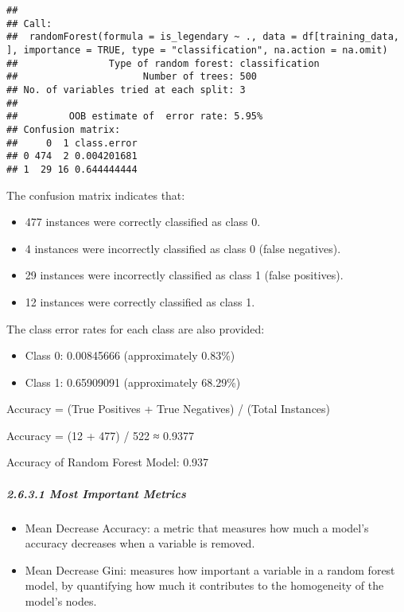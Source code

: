 \documentclass[
]{article}
\begin{document}
\begin{verbatim}
## 
## Call:
##  randomForest(formula = is_legendary ~ ., data = df[training_data,      ], importance = TRUE, type = "classification", na.action = na.omit) 
##                Type of random forest: classification
##                      Number of trees: 500
## No. of variables tried at each split: 3
## 
##         OOB estimate of  error rate: 5.95%
## Confusion matrix:
##     0  1 class.error
## 0 474  2 0.004201681
## 1  29 16 0.644444444
\end{verbatim}

The confusion matrix indicates that:

\begin{itemize}
\item
  477 instances were correctly classified as class 0.
\item
  4 instances were incorrectly classified as class 0 (false negatives).
\item
  29 instances were incorrectly classified as class 1 (false positives).
\item
  12 instances were correctly classified as class 1.
\end{itemize}

The class error rates for each class are also provided:

\begin{itemize}
\item
  Class 0: 0.00845666 (approximately 0.83\%)
\item
  Class 1: 0.65909091 (approximately 68.29\%)
\end{itemize}

Accuracy = (True Positives + True Negatives) / (Total Instances)

Accuracy = (12 + 477) / 522 ≈ 0.9377

Accuracy of Random Forest Model: 0.937

\subparagraph{2.6.3.1 Most Important
Metrics}\label{most-important-metrics}

\begin{itemize}
\item
  Mean Decrease Accuracy: a metric that measures how much a model's
  accuracy decreases when a variable is removed.
\item
  Mean Decrease Gini: measures how important a variable in a random
  forest model, by quantifying how much it contributes to the
  homogeneity of the model's nodes.
\end{itemize}
\end{document}
